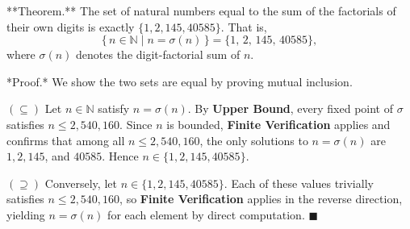 **Theorem.** The set of natural numbers equal to the sum of the factorials of their own digits is exactly $\{1, 2, 145, 40585\}$. That is,
$$\{\, n \in \mathbb{N} \mid n = \sigma(n) \,\} = \{1,\, 2,\, 145,\, 40585\},$$
where $\sigma(n)$ denotes the digit-factorial sum of $n$.

*Proof.* We show the two sets are equal by proving mutual inclusion.

$(\subseteq)$ Let $n \in \mathbb{N}$ satisfy $n = \sigma(n)$. By \textbf{Upper Bound}, every fixed point of $\sigma$ satisfies $n \leq 2{,}540{,}160$. Since $n$ is bounded, \textbf{Finite Verification} applies and confirms that among all $n \leq 2{,}540{,}160$, the only solutions to $n = \sigma(n)$ are $1, 2, 145$, and $40585$. Hence $n \in \{1, 2, 145, 40585\}$.

$(\supseteq)$ Conversely, let $n \in \{1, 2, 145, 40585\}$. Each of these values trivially satisfies $n \leq 2{,}540{,}160$, so \textbf{Finite Verification} applies in the reverse direction, yielding $n = \sigma(n)$ for each element by direct computation. $\blacksquare$